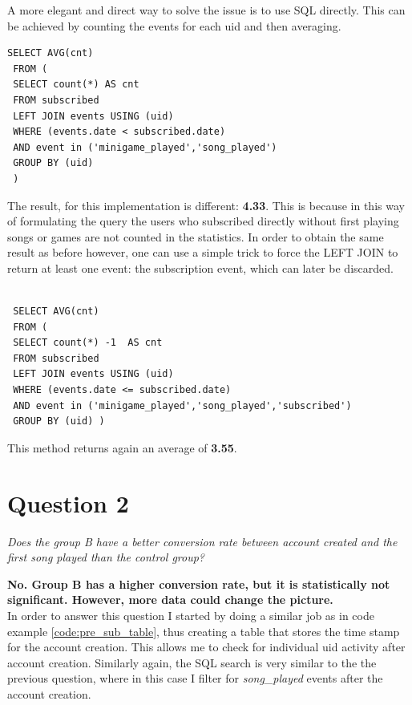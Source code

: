 \documentclass[paper=a4, fontsize=10pt]{report}
\begin{document}
A more elegant and direct way to solve the issue is to use SQL directly. This can be achieved by
counting the events for each uid and then averaging.

\footnotesize
\begin{lstlisting}[frame=single,caption=Return SQL average \label{code:sql_average_table}]
 SELECT AVG(cnt)
 FROM (  
 SELECT count(*) AS cnt
 FROM subscribed 
 LEFT JOIN events USING (uid)
 WHERE (events.date < subscribed.date)
 AND event in ('minigame_played','song_played') 
 GROUP BY (uid)
 )
\end{lstlisting}
\normalsize

The result, for this implementation is different: \textbf{4.33}. This is because in this way of
formulating the query the users who subscribed directly without first playing songs or 
games are not counted in the statistics. In order to obtain the same result as before however, 
one can use a simple trick to force the LEFT JOIN to return at least one event: the subscription event, which can 
later be discarded.

\footnotesize
\begin{lstlisting}[frame=single,caption=Return SQL average - Fixed \label{code:sql_average_fixed_table}]

 SELECT AVG(cnt)
 FROM ( 
 SELECT count(*) -1  AS cnt
 FROM subscribed 
 LEFT JOIN events USING (uid)
 WHERE (events.date <= subscribed.date)
 AND event in ('minigame_played','song_played','subscribed') 
 GROUP BY (uid) )
\end{lstlisting}
\normalsize
This method returns again an average of \textbf{3.55}.


\section*{Question 2}

\textit{Does the group B have a better conversion rate between account created and
the first song played than the control group?}

\textbf{No. Group B has a higher conversion rate, but it is statistically not significant. However, more data could
change the picture.}\\

In order to answer this question I started by doing a similar job as in code example \ref{code:pre_sub_table}, thus creating a table that stores the time stamp
for the account creation. This allows me to check for individual uid activity after account creation. Similarly again, the SQL search is very similar to the 
the previous question, where in this case I filter for \textit{song\_played} events after the account creation.
\end{document}
